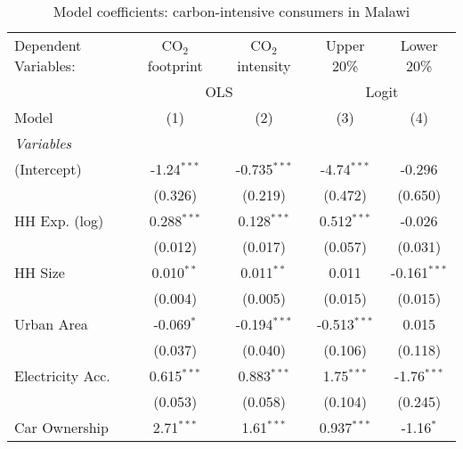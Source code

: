
\begin{table}[htbp!]
   \centering
   \small
   \begin{adjustbox}{width = 1\textwidth, max height = 0.95\textheight, center}
      \begin{threeparttable}[b]
         \caption{\label{tab:Logit_1_MWI} Model coefficients: carbon-intensive consumers in Malawi}
         \begin{tabular}{lcccc}
            \tabularnewline \midrule \midrule
            Dependent Variables: & CO$_{2}$ footprint & CO$_{2}$ intensity & Upper 20\%     & Lower 20\%\\   
             & \multicolumn{2}{c}{OLS} & \multicolumn{2}{c}{Logit} \\ 
            Model                & (1)                & (2)                & (3)            & (4)\\  
            \midrule
            \emph{Variables}\\
            (Intercept)          & -1.24$^{***}$      & -0.735$^{***}$     & -4.74$^{***}$  & -0.296\\   
                                 & (0.326)            & (0.219)            & (0.472)        & (0.650)\\   
            HH Exp. (log)        & 0.288$^{***}$      & 0.128$^{***}$      & 0.512$^{***}$  & -0.026\\   
                                 & (0.012)            & (0.017)            & (0.057)        & (0.031)\\   
            HH Size              & 0.010$^{**}$       & 0.011$^{**}$       & 0.011          & -0.161$^{***}$\\   
                                 & (0.004)            & (0.005)            & (0.015)        & (0.015)\\   
            Urban Area           & -0.069$^{*}$       & -0.194$^{***}$     & -0.513$^{***}$ & 0.015\\   
                                 & (0.037)            & (0.040)            & (0.106)        & (0.118)\\   
            Electricity Acc.     & 0.615$^{***}$      & 0.883$^{***}$      & 1.75$^{***}$   & -1.76$^{***}$\\   
                                 & (0.053)            & (0.058)            & (0.104)        & (0.245)\\   
            Car Ownership        & 2.71$^{***}$       & 1.61$^{***}$       & 0.937$^{***}$  & -1.16$^{*}$\\   

\end{tabular}
\end{threeparttable}
\end{adjustbox}
\end{table}

